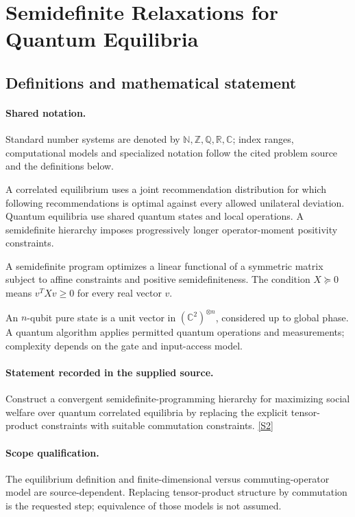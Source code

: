 \documentclass[11pt]{article}
\newcommand{\sref}[2]{\hyperlink{source:#1:#2}{[S#2]}}
\begin{document}
\section{Semidefinite Relaxations for Quantum Equilibria}\label{statement}

\subsection{Definitions and mathematical statement}

\paragraph{Shared notation.}Standard number systems are denoted by $\mathbb N,\mathbb Z,\mathbb Q,\mathbb R,\mathbb C$; index ranges, computational models and specialized notation follow the cited problem source and the definitions below.


A correlated equilibrium uses a joint recommendation distribution for which following recommendations is optimal against every allowed unilateral deviation. Quantum equilibria use shared quantum states and local operations. A semidefinite hierarchy imposes progressively longer operator-moment positivity constraints.

A semidefinite program optimizes a linear functional of a symmetric matrix subject to affine constraints and positive semidefiniteness. The condition $X\succeq0$ means $v^TXv\geq0$ for every real vector $v$.

An $n$-qubit pure state is a unit vector in $(\mathbb C^2)^{\otimes n}$, considered up to global phase. A quantum algorithm applies permitted quantum operations and measurements; complexity depends on the gate and input-access model.
\paragraph{Statement recorded in the supplied source.}
Construct a convergent semidefinite-programming hierarchy for maximizing social welfare over quantum correlated equilibria by replacing the explicit tensor-product constraints with suitable commutation constraints. \sref{statement}{2}
\paragraph{Scope qualification.}
The equilibrium definition and finite-dimensional versus commuting-operator model are source-dependent. Replacing tensor-product structure by commutation is the requested step; equivalence of those models is not assumed.
\end{document}
